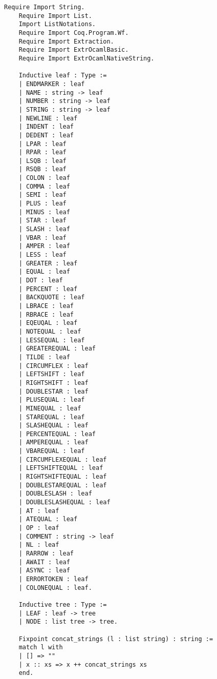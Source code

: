 \begin{lstlisting}[language=Coq]
    Require Import String.
    Require Import List.
    Import ListNotations.
    Require Import Coq.Program.Wf.
    Require Import Extraction.
    Require Import ExtrOcamlBasic.
    Require Import ExtrOcamlNativeString.

    Inductive leaf : Type :=
    | ENDMARKER : leaf
    | NAME : string -> leaf
    | NUMBER : string -> leaf
    | STRING : string -> leaf
    | NEWLINE : leaf
    | INDENT : leaf
    | DEDENT : leaf
    | LPAR : leaf
    | RPAR : leaf
    | LSQB : leaf
    | RSQB : leaf
    | COLON : leaf
    | COMMA : leaf
    | SEMI : leaf
    | PLUS : leaf
    | MINUS : leaf
    | STAR : leaf
    | SLASH : leaf
    | VBAR : leaf
    | AMPER : leaf
    | LESS : leaf
    | GREATER : leaf
    | EQUAL : leaf
    | DOT : leaf
    | PERCENT : leaf
    | BACKQUOTE : leaf
    | LBRACE : leaf
    | RBRACE : leaf
    | EQEUQAL : leaf
    | NOTEQUAL : leaf
    | LESSEQUAL : leaf
    | GREATEREQUAL : leaf
    | TILDE : leaf
    | CIRCUMFLEX : leaf
    | LEFTSHIFT : leaf
    | RIGHTSHIFT : leaf
    | DOUBLESTAR : leaf
    | PLUSEQUAL : leaf
    | MINEQUAL : leaf
    | STAREQUAL : leaf
    | SLASHEQUAL : leaf
    | PERCENTEQUAL : leaf
    | AMPEREQUAL : leaf
    | VBAREQUAL : leaf
    | CIRCUMFLEXEQUAL : leaf
    | LEFTSHIFTEQUAL : leaf
    | RIGHTSHIFTEQUAL : leaf
    | DOUBLESTAREQUAL : leaf
    | DOUBLESLASH : leaf
    | DOUBLESLASHEQUAL : leaf
    | AT : leaf
    | ATEQUAL : leaf
    | OP : leaf
    | COMMENT : string -> leaf
    | NL : leaf
    | RARROW : leaf
    | AWAIT : leaf
    | ASYNC : leaf
    | ERRORTOKEN : leaf
    | COLONEQUAL : leaf.

    Inductive tree : Type :=
    | LEAF : leaf -> tree
    | NODE : list tree -> tree.

    Fixpoint concat_strings (l : list string) : string :=
    match l with
    | [] => "" 
    | x :: xs => x ++ concat_strings xs
    end.


\end{lstlisting}

